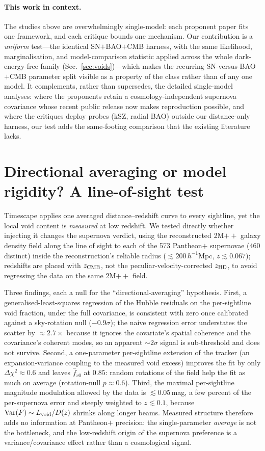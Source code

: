 \documentclass[aps,prd,twocolumn,nofootinbib,superscriptaddress,floatfix]{revtex4-2}
\newcommand{\fvo}{f_{v0}}
\begin{document}
\paragraph*{This work in context.} The studies above are overwhelmingly single-model:
each proponent paper fits one framework, and each critique bounds one mechanism.
Our contribution is a \emph{uniform} test---the identical SN$+$BAO$+$CMB harness,
with the same likelihood, marginalisation, and model-comparison statistic applied
across the whole dark-energy-free family (Sec.~\ref{sec:voids})---which makes the
recurring SN-versus-BAO$+$CMB parameter split visible as a property of the class
rather than of any one model. It complements, rather than supersedes, the
detailed single-model analyses: where the proponents retain a
cosmology-independent supernova covariance whose recent public release now makes
reproduction possible, and where the critiques deploy probes (kSZ, radial BAO)
outside our distance-only harness, our test adds the same-footing comparison that
the existing literature lacks.

\section{Directional averaging or model rigidity? A line-of-sight test}
\label{sec:losvoids}
Timescape applies one averaged distance--redshift curve to every sightline, yet the local
void content is \emph{measured} at low redshift. We tested directly whether injecting it changes
the supernova verdict, using the reconstructed 2M$++$ galaxy density field
\cite{Carrick2015} along the line of sight to each of the 573 Pantheon$+$ supernovae
($460$ distinct) inside the reconstruction's reliable radius ($\lesssim200\,h^{-1}$Mpc,
$z\lesssim0.067$); redshifts are placed with $z_{\rm CMB}$, not the peculiar-velocity-corrected
$z_{\rm HD}$, to avoid regressing the data on the same 2M$++$ field.

Three findings, each a null for the ``directional-averaging'' hypothesis. First, a generalised-least-squares
regression of the Hubble residuals on the per-sightline void fraction, under the full
covariance, is consistent with zero once calibrated against a sky-rotation null
($-0.9\sigma$); the naive regression error understates the scatter by $\approx2.7\times$
because it ignores the covariate's spatial coherence and the covariance's coherent modes, so an
apparent $\sim\!2\sigma$ signal is sub-threshold and does not survive. Second, a one-parameter
per-sightline extension of the tracker (an expansion-variance coupling to the measured void excess)
improves the fit by only $\Delta\chi^{2}\approx0.6$ and leaves $\hat\fvo$ at $0.85$: random
rotations of the field help the fit as much on average (rotation-null $p\approx0.6$). Third, the
maximal per-sightline magnitude modulation allowed by the data is $\lesssim0.05$\,mag, a few percent
of the per-supernova error and steeply weighted to $z\lesssim0.1$, because $\mathrm{Var}(F)\sim
L_{\rm void}/D(z)$ shrinks along longer beams. Measured structure therefore adds no information
at Pantheon$+$ precision: the single-parameter \emph{average} is not the bottleneck, and the
low-redshift origin of the supernova preference is a variance/covariance effect rather than a
cosmological signal.
\end{document}
